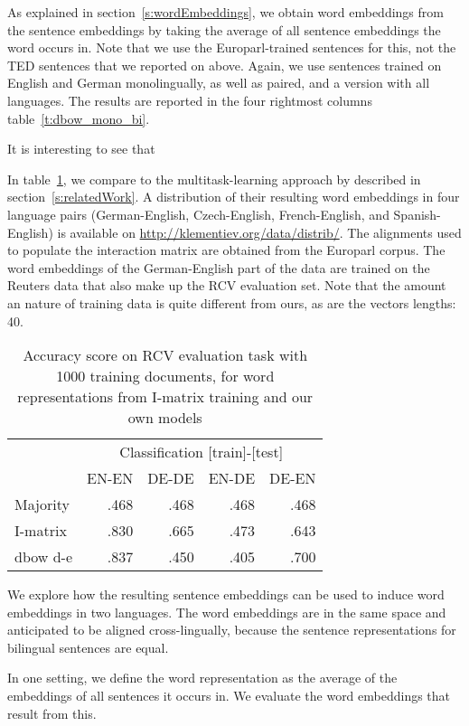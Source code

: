 As explained in section~\ref{s:wordEmbeddings}, we obtain word embeddings from the sentence embeddings by taking the average of all sentence embeddings the word occurs in. Note that we use the Europarl-trained sentences for this, not the TED sentences that we reported on above. Again, we use sentences trained on English and German monolingually, as well as paired, and a version with all languages. The results are reported in the four rightmost columns table~\ref{t:dbow_mono_bi}.

It is interesting to see that %


In table~\ref{t:dbow_bi_klemen}, we compare to the multitask-learning approach by \cite{klementiev2012inducing} described in section~\ref{s:relatedWork}. A distribution of their resulting word embeddings in four language pairs (German-English, Czech-English, French-English, and Spanish-English) is available on \url{http://klementiev.org/data/distrib/}. The alignments used to populate the interaction matrix are obtained from the Europarl corpus. The word embeddings of the German-English part of the data are trained on the Reuters data that also make up the RCV evaluation set. Note that the amount an nature of training data is quite different from ours, as are the vectors lengths: 40.



\begin{table}
\setlength\tabcolsep{2pt}
\begin{tabular}{l | r r r r}
		& \multicolumn{4}{c}{Classification [train]-[test]}	\\
		&EN-EN	&DE-DE	&EN-DE	&DE-EN	\\\hline
Majority	&.468		&.468		&.468		&.468		\\
I-matrix	&.830		&.665		&.473		&.643		\\
dbow d-e 	&.837		&.450		&.405		&.700		\\
\end{tabular}
\caption{Accuracy score on RCV evaluation task with 1000 training documents, for word representations from I-matrix training and our own models}
\label{t:dbow_bi_klemen}
\end{table}



We explore how the resulting sentence embeddings can be used to induce word embeddings in two languages. The word embeddings are in the same space and anticipated to be aligned cross-lingually, because the sentence representations for bilingual sentences are equal.

In one setting, we define the word representation as the average of the embeddings of all sentences it occurs in. We evaluate the word embeddings that result from this.



